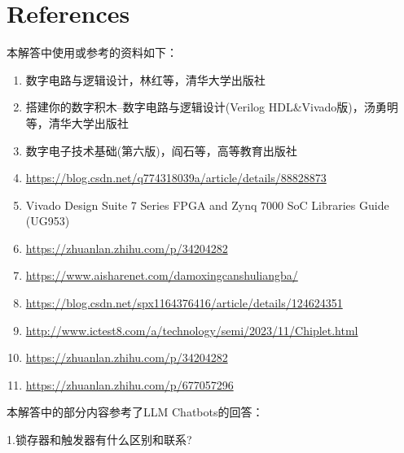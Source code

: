 \documentclass[11pt, a4 paper]{article}
\begin{document}
\section{References}
本解答中使用或参考的资料如下：
\begin{enumerate}[nosep]
    \item 数字电路与逻辑设计，林红等，清华大学出版社
    \item 搭建你的数字积木--数字电路与逻辑设计(Verilog HDL\&Vivado版)，汤勇明等，清华大学出版社
    \item 数字电子技术基础(第六版)，阎石等，高等教育出版社
    \item \url{https://blog.csdn.net/q774318039a/article/details/88828873}
    \item Vivado Design Suite 7 Series FPGA and Zynq 7000 SoC Libraries Guide (UG953)
    \item \url{https://zhuanlan.zhihu.com/p/34204282}
    \item \url{https://www.aisharenet.com/damoxingcanshuliangba/}
    \item \url{https://blog.csdn.net/spx1164376416/article/details/124624351}
    \item \url{http://www.ictest8.com/a/technology/semi/2023/11/Chiplet.html}
    \item \url{https://zhuanlan.zhihu.com/p/34204282}
    \item \url{https://zhuanlan.zhihu.com/p/677057296}
\end{enumerate}
本解答中的部分内容参考了LLM Chatbots的回答：

1.锁存器和触发器有什么区别和联系?
\end{document}

